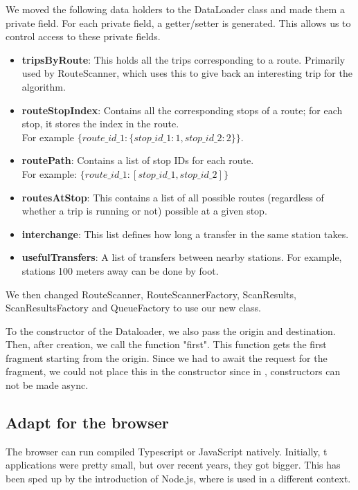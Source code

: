 We moved the following data holders to the DataLoader class and made them a private field. For each private field, a getter/setter is generated. This allows us to control access to these private fields.
\begin{itemize}
    \item \textbf{tripsByRoute}: This holds all the trips corresponding to a route. Primarily used by RouteScanner, which uses this to give back an interesting trip for the  algorithm.
    \item \textbf{routeStopIndex}: Contains all the corresponding stops of a route; for each stop, it stores the index in the route.\\ For example $\{route\_id\_1:\{stop\_id\_1:1,stop\_id\_2:2\}\}$.
    \item \textbf{routePath}: Contains a list of stop IDs for each route.\\ For example: $\{route\_id\_1:[stop\_id\_1,stop\_id\_2]\}$
    \item \textbf{routesAtStop}: This contains a list of all possible routes (regardless of whether a trip is running or not) possible at a given stop.
    \item \textbf{interchange}: This list defines how long a transfer in the same station takes.
    \item \textbf{usefulTransfers}: A list of transfers between nearby stations. For example, stations 100 meters away can be done by foot.
\end{itemize}

We then changed RouteScanner, RouteScannerFactory, ScanResults, ScanResultsFactory and QueueFactory to use our new class.

To the constructor of the Dataloader, we also pass the origin and destination. Then, after creation, we call the function "first". This function gets the first fragment starting from the origin. Since we had to await the request for the fragment, we could not place this in the constructor since in , constructors can not be made async.


\subsubsection{}


\subsection{Adapt for the browser}
The browser can run compiled Typescript or JavaScript natively. Initially, t  applications were pretty small, but over recent years, they got bigger. This has been sped up by the introduction of Node.js, where  is used in a different context. 

